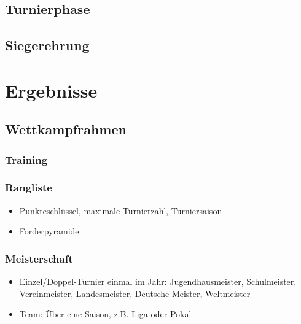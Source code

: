 \subsection{Turnierphase}
\label{turniere:durchfuehrung:turnierphase}

\subsection{Siegerehrung}
\label{turniere:durchfuehrung:siegerehrung}


\section{Ergebnisse}
\label{turniere:ergebnisse}

\subsection{Wettkampfrahmen}
\label{turniere:ergebnisse:rahmen}

\subsubsection{Training}
\label{turniere:ergebnisse:rahmen:training}

\subsubsection{Rangliste}
\label{turniere:ergebnisse:rahmen:rangliste}

\begin{itemize}
\item Punkteschlüssel, maximale Turnierzahl, Turniersaison
\item Forderpyramide
\end{itemize}

\subsubsection{Meisterschaft}
\label{turniere:ergebnisse:rahmen:meisterschaft}

\begin{itemize}
\item Einzel/Doppel-Turnier einmal im Jahr: Jugendhausmeister, Schulmeister, Vereinmeister, Landesmeister, Deutsche Meister, Weltmeister
\item Team: Über eine Saison, z.B. Liga oder Pokal
\end{itemize}



